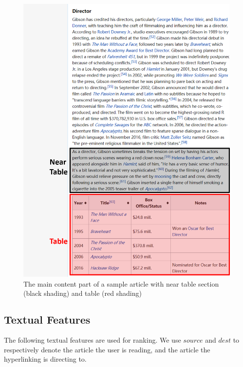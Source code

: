\begin{figure}[t]
\centering
\includegraphics[width=1\columnwidth]{vis_example3}
\caption{The main content part of a sample article with near table section (black shading) and table (red shading)}
\label{vis_example3}
\end{figure}

\subsection{Textual Features}

The following textual features are used for ranking. We use $source$ and $dest$ to respectively denote the article the user is reading, and the article the hyperlinking is directing to.

